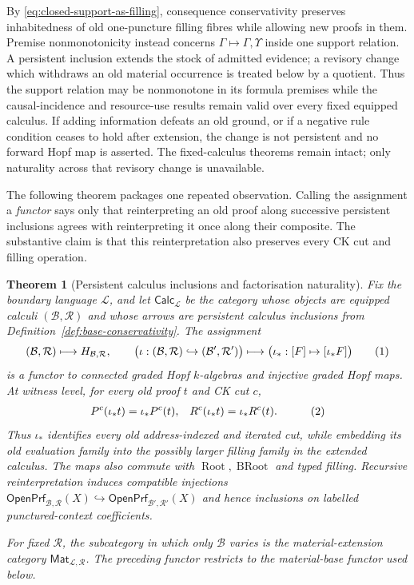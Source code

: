\documentclass[10pt,a4paper]{article}
\theoremstyle{plain}
\newtheorem{theorem}{Theorem}[section]
\theoremstyle{definition}
\theoremstyle{remark}
\newcommand{\Base}{\mathcal B}
\newcommand{\Rules}{\mathcal R}
\newcommand{\Lang}{\mathcal L}
\newcommand{\Root}{\operatorname{Root}}
\newcommand{\BRoot}{\operatorname{BRoot}}
\newcommand{\OpenPrf}{\mathsf{OpenPrf}}
\newcommand{\eqtag}{\refstepcounter{equation}\tag{\theequation}}
\begin{document}
By \eqref{eq:closed-support-as-filling}, consequence conservativity
preserves inhabitedness of old one-puncture filling fibres while allowing
new proofs in them.  Premise nonmonotonicity instead concerns
\(\Gamma\mapsto\Gamma,\Upsilon\) inside one support relation.  A persistent
inclusion extends the stock of admitted evidence; a revisory change which
withdraws an old material occurrence is treated below by a quotient.
Thus the support relation may be nonmonotone in its formula premises while
the causal-incidence and resource-use results remain valid over every fixed
equipped calculus.  If adding information defeats an old ground, or if a negative rule
condition ceases to hold after extension, the change is not persistent and
no forward Hopf map is asserted.  The fixed-calculus theorems remain intact;
only naturality across that revisory change is unavailable.

The following theorem packages one repeated observation.  Calling the
assignment a \emph{functor} says only that reinterpreting an old proof along
successive persistent inclusions agrees with reinterpreting it once along
their composite.  The substantive claim is that this reinterpretation also
preserves every CK cut and filling operation.

\begin{theorem}[Persistent calculus inclusions and factorisation naturality]
\label{thm:base-hopf-functor}
Fix the boundary language \(\Lang\), and let
\(\mathsf{Calc}_{\Lang}\) be the category whose objects are equipped
calculi \((\Base,\Rules)\) and whose arrows are persistent calculus
inclusions from Definition~\ref{def:base-conservativity}.  The assignment
\[
 (\Base,\Rules)\longmapsto H_{\Base,\Rules},
\qquad
 \bigl(\iota:(\Base,\Rules)\hookrightarrow
                  (\Base',\Rules')\bigr)
 \longmapsto
 \bigl(\iota_*:[F]\mapsto[\iota_*F]\bigr)
\eqtag\label{eq:base-hopf-functor}
\]
is a functor to connected graded Hopf \(k\)-algebras and injective graded
Hopf maps.  At witness level, for every old proof \(t\) and CK cut
\(c\),
\[
\begin{aligned}
P^c(\iota_*t)&=\iota_*P^c(t),&
R^c(\iota_*t)&=\iota_*R^c(t).
\end{aligned}
\eqtag\label{eq:base-linked-naturality}
\]
Thus \(\iota_*\) identifies every old address-indexed and iterated cut, while
embedding its old evaluation family into the possibly larger filling
family in the extended calculus.
The maps also commute with \(\Root,\BRoot\) and typed filling.  Recursive
reinterpretation induces compatible
injections
\(
\OpenPrf_{\Base,\Rules}(X)\hookrightarrow
\OpenPrf_{\Base',\Rules'}(X)
\)
and hence inclusions on labelled punctured-context coefficients.

For fixed \(\Rules\), the subcategory in which only \(\Base\) varies is
the material-extension category
\(\mathsf{Mat}_{\Lang,\Rules}\).  The preceding functor restricts to the
material-base functor used below.
\end{theorem}
\end{document}
